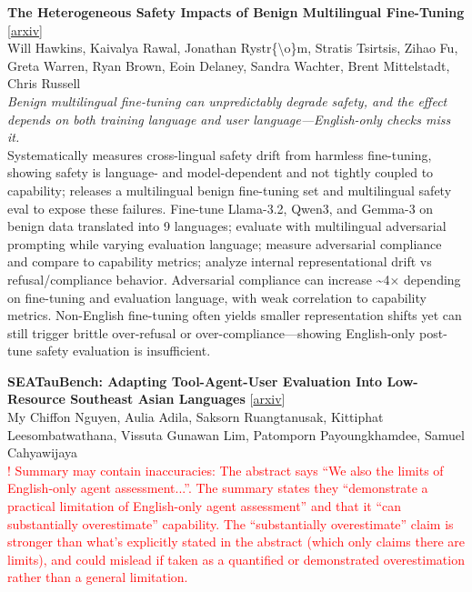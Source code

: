 \documentclass[12pt,letterpaper]{article}
\begin{document}
\medskip

{\small\textbf{The Heterogeneous Safety Impacts of Benign Multilingual Fine-Tuning}} {\scriptsize[\href{https://arxiv.org/abs/2606.28843}{arxiv}]}\\
{\scriptsize Will Hawkins, Kaivalya Rawal, Jonathan Rystr\{\textbackslash{}o\}m, Stratis Tsirtsis, Zihao Fu, Greta Warren, Ryan Brown, Eoin Delaney, Sandra Wachter, Brent Mittelstadt, Chris Russell}\\

{\small\textit{Benign multilingual fine-tuning can unpredictably degrade safety, and the effect depends on both training language and user language---English-only checks miss it.}}\\[1pt]
{\footnotesize Systematically measures cross-lingual safety drift from harmless fine-tuning, showing safety is language- and model-dependent and not tightly coupled to capability; releases a multilingual benign fine-tuning set and multilingual safety eval to expose these failures. Fine-tune Llama-3.2, Qwen3, and Gemma-3 on benign data translated into 9 languages; evaluate with multilingual adversarial prompting while varying evaluation language; measure adversarial compliance and compare to capability metrics; analyze internal representational drift vs refusal/compliance behavior. Adversarial compliance can increase \textasciitilde{}4× depending on fine-tuning and evaluation language, with weak correlation to capability metrics. Non-English fine-tuning often yields smaller representation shifts yet can still trigger brittle over-refusal or over-compliance---showing English-only post-tune safety evaluation is insufficient.}

\medskip

{\small\textbf{SEATauBench: Adapting Tool-Agent-User Evaluation Into Low-Resource Southeast Asian Languages}} {\scriptsize[\href{https://arxiv.org/abs/2606.28715}{arxiv}]}\\
{\scriptsize My Chiffon Nguyen, Aulia Adila, Saksorn Ruangtanusak, Kittiphat Leesombatwathana, Vissuta Gunawan Lim, Patomporn Payoungkhamdee, Samuel Cahyawijaya}\\

{\scriptsize\textcolor{red}{! Summary may contain inaccuracies: The abstract says ``We also the limits of English-only agent assessment...''. The summary states they ``demonstrate a practical limitation of English-only agent assessment'' and that it ``can substantially overestimate'' capability. The ``substantially overestimate'' claim is stronger than what's explicitly stated in the abstract (which only claims there are limits), and could mislead if taken as a quantified or demonstrated overestimation rather than a general limitation.}}\\[1pt]
\end{document}
